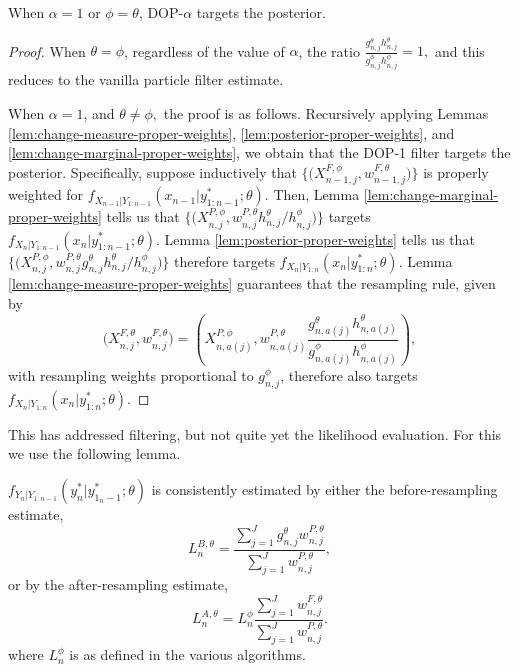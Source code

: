 \begin{prop}
    When $\alpha=1$ or $\phi=\theta$, DOP-$\alpha$ targets the posterior. 
\end{prop}
\begin{proof}
    When $\theta=\phi$, regardless of the value of $\alpha$, the ratio $\frac{g_{n,j}^\theta h_{n,j}^\theta}{g_{n,j}^\phi h_{n,j}^\phi}=1,$ and this reduces to the vanilla particle filter estimate.

    When $\alpha=1$, and $\theta\neq\phi,$ the proof is as follows. Recursively applying Lemmas \ref{lem:change-measure-proper-weights}, \ref{lem:posterior-proper-weights}, and \ref{lem:change-marginal-proper-weights}, we obtain that 
    the DOP-1 filter targets the posterior.
    Specifically, suppose inductively that $\big\{\big(X^{F,\phi}_{n-1,j},w^{F,\theta}_{n-1,j}\big)\big\}$ is properly weighted for $f_{X_{n-1}|Y_{1:n-1}}(x_{n-1}|y^*_{1:n-1};\theta)$.
    Then, Lemma \ref{lem:change-marginal-proper-weights} tells us that $\big\{\big(X^{P,\phi}_{n,j},w^{P,\theta}_{n,j} h_{n,j}^\theta /h_{n,j}^\phi\big)\big\}$ targets $f_{X_{n}|Y_{1:n-1}}(x_{n}|y^*_{1:n-1};\theta)$.
    Lemma \ref{lem:posterior-proper-weights} tells us that $\big\{\big(X^{P,\phi}_{n,j},w^{P,\theta}_{n,j} g^\theta_{n,j}h_{n,j}^\theta /h_{n,j}^\phi \big)\big\}$ therefore targets  $f_{X_{n}|Y_{1:n}}(x_{n}|y^*_{1:n};\theta)$.
    Lemma \ref{lem:change-measure-proper-weights} guarantees that the resampling rule, given by 
    \[
    \big(X^{F,\theta}_{n,j},w^{F,\theta}_{n,j}\big) = \left(X^{P,\phi}_{n,a(j)}, w^{P,\theta}_{n,a(j)} \frac{g^\theta_{n,a(j)}h_{n,a(j)}^\theta}{g^\phi_{n,a(j)}h_{n,a(j)}^\phi}\right),
    \]
    with resampling weights proportional to $g^\phi_{n,j}$, therefore also targets $f_{X_{n}|Y_{1:n}}(x_{n}|y^*_{1:n};\theta)$.
\end{proof}


This has addressed filtering, but not quite yet the likelihood evaluation. For this we use the following lemma.

\begin{lem}
    \label{lem:lik-proper-weight}
  $f_{Y_n|Y_{1:n-1}}(y_n^*|y_{1_n-1}^*;\theta)$ is consistently estimated by either the before-resampling estimate,
\begin{equation}\label{L1}
L_n^{B,\theta} =  \frac{\sum_{j=1}^Jg^\theta_{n,j} w^{P,\theta}_{n,j}}{\sum_{j=1}^J  w^{P,\theta}_{n,j}},
\end{equation}
or by the after-resampling estimate,
\begin{equation}\label{L2}
L_n^{A,\theta} = L^\phi_n \frac{\sum_{j=1}^Jw^{F,\theta}_{n,j}}{\sum_{j=1}^J  w^{P,\theta}_{n,j}}.
\end{equation}
where $L^\phi_n$ is as defined in the various algorithms.
\end{lem}

